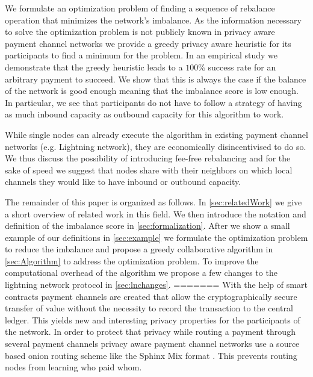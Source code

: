\documentclass[a4paper]{paper}
\begin{document}
We formulate an optimization problem of finding a sequence of rebalance operation that minimizes the network's imbalance.
As the information necessary to solve the optimization problem is not publicly known in privacy aware payment channel networks we provide a greedy privacy aware heuristic for its participants to find a minimum for the problem. 
In an empirical study we demonstrate that the greedy heuristic leads to a $100\%$ success rate for an arbitrary payment to succeed.
We show that this is always the case if the balance of the network is good enough meaning that the imbalance score is low enough.
In particular, we see that participants do not have to follow a strategy of having as much inbound capacity as outbound capacity for this algorithm to work. 

While single nodes can already execute the algorithm in existing payment channel networks (e.g. Lightning network), they are economically disincentivised to do so.
We thus discuss the possibility of introducing fee-free rebalancing and for the sake of speed we suggest that nodes share with their neighbors on which local channels they would like to have inbound or outbound capacity. 

The remainder of this paper is organized as follows. 
In \cref{sec:relatedWork} we give a short overview of related work in this field.
We then introduce the notation and definition of the imbalance score in \cref{sec:formalization}.
After we show a small example of our definitions in \cref{sec:example} we formulate the optimization problem to reduce the imbalance and propose a greedy collaborative algorithm in \cref{sec:Algorithm} to address the optimization problem.
To improve the computational overhead of the algorithm we propose a few changes to the lightning network protocol in \cref{sec:lnchanges}.
=======
With the help of smart contracts payment channels are created that allow the cryptographically secure transfer of value without the necessity to record the transaction to the central ledger.
This yields new and interesting privacy properties for the participants of the network.
In order to protect that privacy while routing a payment through several payment channels privacy aware payment channel networks use a source based onion routing scheme like the Sphinx Mix format \cite{danezis2009sphinx}.
This prevents routing nodes from learning who paid whom.
\end{document}

